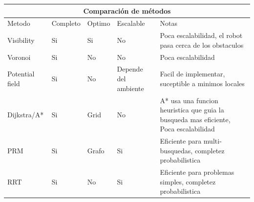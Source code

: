 \documentclass[
	11pt, %
]{beamer}
\begin{document}
\begin{frame}{}
  \centering
  \begin{tabular}{ |p{1cm}||p{0.8cm}|p{0.8cm}|p{1.2cm}|p{5cm}|  }
    \hline
    \multicolumn{5}{|c|}{\tiny Comparaci\'{o}n de m\'{e}todos} \\
    \hline 
    \tiny Metodo& \tiny Completo & \tiny Optimo& \tiny Escalable& \tiny Notas \\
    \hline
    \tiny Visibility   & \tiny Si    & \tiny Si&   \tiny No& \tiny Poca escalabilidad, el robot pasa cerca de los obstaculos\\
    \hline
    \tiny Voronoi   & \tiny Si    & \tiny No&   \tiny No& \tiny Poca escalabilidad\\
    \hline
    \tiny Potential field   & \tiny Si    & \tiny No&   \tiny Depende del ambiente& \tiny Facil de implementar, suceptible a minimos locales\\
    \hline
    \tiny Dijkstra/A*   & \tiny Si    & \tiny Grid&   \tiny No& \tiny A* usa una funcion heuristica que guia la busqueda mas eficiente, Poca escalabilidad\\
    \hline
    \tiny PRM   & \tiny Si    & \tiny Grafo&   \tiny Si&  \tiny Eficiente para multi-busquedas, completez probabilistica \\
    \hline
    \tiny RRT   & \tiny Si    & \tiny No&   \tiny Si&  \tiny Eficiente para problemas simples, completez probabilistica\\
    \hline
  \end{tabular}  
\end{frame}
\end{document}
